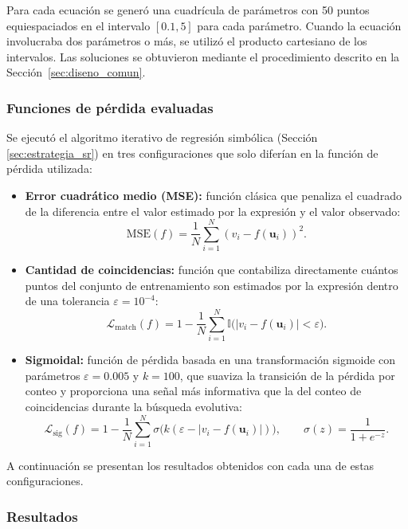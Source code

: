 \documentclass{article} \usepackage[utf8]{inputenc} \usepackage[spanish]{babel} \usepackage{amsmath, amssymb, amsthm} \usepackage{bm} \usepackage{float} \usepackage{longtable} \usepackage[hidelinks]{hyperref} \spanishdecimal{.}
\begin{document}
Para cada ecuación se generó una cuadrícula de parámetros con 50 puntos equiespaciados en el intervalo $[0.1, 5]$ para cada parámetro. Cuando la ecuación involucraba dos parámetros o más, se utilizó el producto cartesiano de los intervalos. Las soluciones se obtuvieron mediante el procedimiento descrito en la Sección~\ref{sec:diseno_comun}.

\subsubsection{Funciones de pérdida evaluadas}

Se ejecutó el algoritmo iterativo de regresión simbólica (Sección \ref{sec:estrategia_sr}) en tres configuraciones que solo diferían en la función de pérdida utilizada:

\begin{itemize} \item \textbf{Error cuadrático medio (MSE):} función clásica que penaliza el cuadrado de la diferencia entre el valor estimado por la expresión y el valor observado: \[ \text{MSE}(f) = \frac{1}{N} \sum_{i=1}^{N} \left( v_i - f(\mathbf{u}_i) \right)^2 . \]

    \item \textbf{Cantidad de coincidencias:} función que contabiliza directamente cuántos puntos del conjunto de entrenamiento son estimados por la expresión dentro de una tolerancia $\varepsilon = 10^{-4}$: \[ \mathcal{L}_{\text{match}}(f) = 1 - \frac{1}{N} \sum_{i=1}^{N} \mathbb{I}\bigl( |v_i - f(\mathbf{u}_i)| < \varepsilon \bigr). \]

    \item \textbf{Sigmoidal:} función de pérdida basada en una transformación sigmoide con parámetros $\varepsilon = 0.005$ y $k = 100$, que suaviza la transición de la pérdida por conteo y proporciona una señal más informativa que la del conteo de coincidencias durante la búsqueda evolutiva: \[ \mathcal{L}_{\text{sig}}(f) = 1 - \frac{1}{N} \sum_{i=1}^{N} \sigma\bigl( k (\varepsilon - |v_i - f(\mathbf{u}_i)|) \bigr), \qquad \sigma(z) = \frac{1}{1 + e^{-z}} . \] \end{itemize}

A continuación se presentan los resultados obtenidos con cada una de estas configuraciones.

\subsubsection{Resultados}
\end{document}
